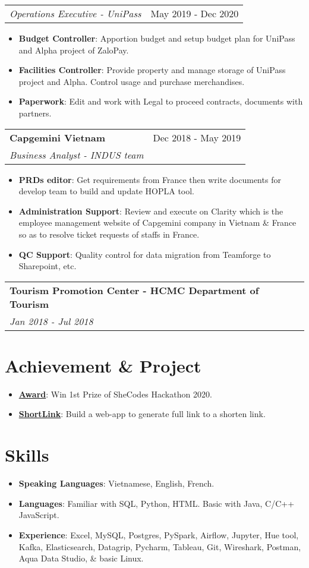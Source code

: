 \documentclass[letterpaper,11pt]{article}
\makeatletter
\newcommand{\resumeItem}[2]{
  \item\small{
    \textbf{#1}{: #2 \vspace{-2pt}}
  }
}
\newcommand{\resumeSubheading}[4]{
  \vspace{-1pt}
  \item
    \begin{tabular*}{0.97\textwidth}{l@{\extracolsep{\fill}}r}
      \textbf{#1} & #2 \\
      \textit{\small#3} & \textit{\small #4} \\
    \end{tabular*}\vspace{-5pt}
}
\newcommand{\resumeSubheadingNoTitle}[2]{
  \vspace{-1pt}
    \begin{tabular*}{0.97\textwidth}{l@{\extracolsep{\fill}}r}
      \textit{\small#1} & #2 \\
    \end{tabular*}\vspace{-5pt}
}
\newcommand{\resumeSubItem}[2]{\resumeItem{#1}{#2}\vspace{-4pt}}
\newcommand{\resumeSubHeadingListStart}{\begin{itemize}[leftmargin=*]}
\newcommand{\resumeSubHeadingListEnd}{\end{itemize}}
\newcommand{\resumeItemListStart}{\begin{itemize}}
\newcommand{\resumeItemListEnd}{\end{itemize}\vspace{-5pt}}
\makeatother
\begin{document}
    \resumeSubheadingNoTitle
      {Operations Executive - UniPass}{May 2019 - Dec 2020}
      \resumeItemListStart
        \resumeItem{Budget Controller}
          {Apportion budget and setup budget plan for UniPass and Alpha project of ZaloPay.} 
        \resumeItem{Facilities Controller}
          {Provide property and manage storage of UniPass project and Alpha. Control usage and purchase merchandises.}
        \resumeItem{Paperwork}
          {Edit and work with Legal to proceed contracts, documents with partners. }
      \resumeItemListEnd
      
    \resumeSubheading
      {Capgemini Vietnam}{Dec 2018 - May 2019}
      {Business Analyst - INDUS team}{}
      \resumeItemListStart
        \resumeItem{PRDs editor}
          {Get requirements from France then write documents for develop team to build and update HOPLA tool.} 
        \resumeItem{Administration Support}
            {Review and execute on Clarity which is the employee management website of Capgemini company in Vietnam \& France so as to resolve ticket requests of staffs in France. }
        \resumeItem{QC Support}    
            {Quality control for data migration from Teamforge to Sharepoint, etc. }
      \resumeItemListEnd


    \resumeSubheading
      {Tourism Promotion Center - HCMC Department of Tourism}{}{Jan 2018 - Jul 2018}
  \resumeSubHeadingListEnd
  
  
\section{Achievement \& Project}
  \resumeSubHeadingListStart 
    \resumeSubItem{\href{}{Award}}
      {Win 1st Prize of SheCodes Hackathon 2020. }
    \resumeSubItem{\href{https://github.com/tuyen-nnt/shortenLink}{ShortLink}}
      {Build a web-app to generate full link to a shorten link.}
\resumeSubHeadingListEnd

  
\section{Skills}
  \resumeSubHeadingListStart
    \resumeSubItem{Speaking Languages}
      {Vietnamese, English, French.}
    \resumeSubItem{Languages}
      {Familiar with SQL, Python, HTML. Basic with Java, C/C++ JavaScript.}
    \resumeSubItem{Experience}
      {Excel, MySQL, Postgres, PySpark, Airflow, Jupyter, Hue tool, Kafka, Elasticsearch, Datagrip, Pycharm, Tableau, Git, Wireshark, Postman, Aqua Data Studio, \& basic Linux.}
\resumeSubHeadingListEnd
  
\end{document}
